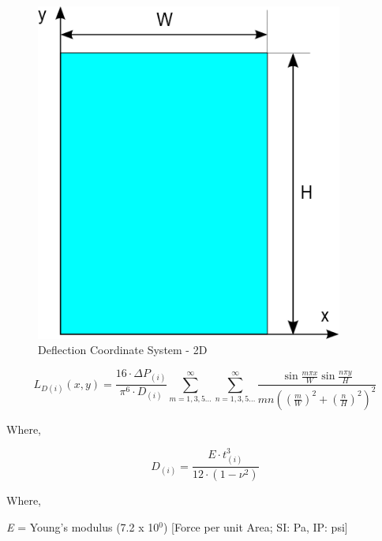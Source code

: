 \begin{figure}[hbtp] %
\centering
\includegraphics[width=0.9\textwidth, height=0.9\textheight, keepaspectratio=true]{media/image1779.png}
\caption{Deflection Coordinate System - 2D \protect \label{fig:deflection-coordinate-system-2d}}
\end{figure}

\begin{equation}
{L_{D\left( i \right)}}\left( {x,y} \right) = \frac{{16\cdot \Delta {P_{\left( i \right)}}}}{{{\pi ^6}\cdot {D_{\left( i \right)}}}}\mathop \sum \limits_{m = 1,3,5 \ldots }^\infty  \mathop \sum \limits_{n = 1,3,5 \ldots }^\infty  \frac{{\sin \frac{{m\pi x}}{W}\sin \frac{{n\pi y}}{H}}}{{mn{{\left( {{{\left( {\frac{m}{W}} \right)}^2} + {{\left( {\frac{n}{H}} \right)}^2}} \right)}^2}}}
\end{equation}

Where,

\begin{equation}
{D_{\left( i \right)}} = \frac{{E\cdot t_{\left( i \right)}^3}}{{12\cdot \left( {1 - {\nu ^2}} \right)}}
\end{equation}

Where,

\emph{E} = Young's modulus (7.2 x 10\(^{0}\)) {[}Force per unit Area; SI: Pa, IP: psi{]}

